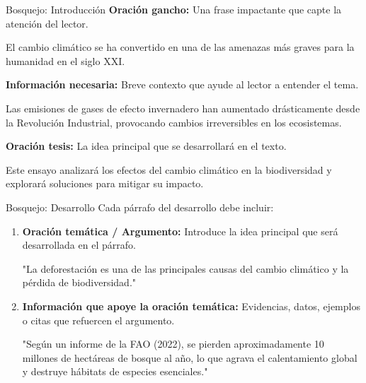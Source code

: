 \documentclass[
11pt, %
]{beamer}
\begin{document}
\begin{frame}{Bosquejo: Introducción}
	\textbf{Oración gancho:} Una frase impactante que capte la atención del lector.
	\begin{block}{}
		El cambio climático se ha convertido en una de las amenazas más graves para la humanidad en el siglo XXI.
	\end{block}

	\textbf{Información necesaria:} Breve contexto que ayude al lector a entender el tema.
	\begin{block}{}
		Las emisiones de gases de efecto invernadero han aumentado drásticamente desde la Revolución Industrial, provocando cambios irreversibles en los ecosistemas.
	\end{block}

	\textbf{Oración tesis:} La idea principal que se desarrollará en el texto.
	\begin{block}{}
		Este ensayo analizará los efectos del cambio climático en la biodiversidad y explorará soluciones para mitigar su impacto.
	\end{block}

\end{frame}

\begin{frame}{Bosquejo: Desarrollo}
	Cada párrafo del desarrollo debe incluir:

	\begin{enumerate}
		\item \textbf{Oración temática / Argumento:} Introduce la idea principal que será desarrollada en el párrafo.
		      \begin{block}{}
			      "La deforestación es una de las principales causas del cambio climático y la pérdida de biodiversidad."
		      \end{block}

		\item \textbf{Información que apoye la oración temática:} Evidencias, datos, ejemplos o citas que refuercen el argumento.
		      \begin{block}{}
			      "Según un informe de la FAO (2022), se pierden aproximadamente 10 millones de hectáreas de bosque al año, lo que agrava el calentamiento global y destruye hábitats de especies esenciales."
		      \end{block}
	\end{enumerate}
\end{frame}
\end{document}
